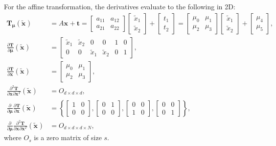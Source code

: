 \documentclass[]{article}
\newcommand{\vT}{\bm{T}}
\newcommand{\vmu}{\bm{\mu}}
\newcommand{\vTmu}{\bm{T_{\mu}}}
\newcommand{\vx}[1][]{\bm{x}_{#1}}
\newcommand{\vxt}[1][]{\bm{\widetilde x}_{#1}}
\newcommand{\D}[2]{\frac{\partial #1}{\partial #2}}
\newcommand{\Dd}[3]{\frac{\partial^2 #1}{\partial #2 \partial #3}}
\begin{document}
For the affine transformation, the derivatives evaluate to the
following in 2D:
\begin{align}
\vTmu(\vxt) &= A \vx + \bm{t} = \begin{bmatrix} a_{11} & a_{12}
\\ a_{21} & a_{22} \end{bmatrix} \begin{bmatrix} \widetilde x_1 \\
\widetilde x_2 \end{bmatrix} + \begin{bmatrix} t_1 \\ t_2
\end{bmatrix} = \begin{bmatrix} \mu_0 & \mu_1
\\ \mu_2 & \mu_3 \end{bmatrix} \begin{bmatrix} \widetilde x_1 \\
\widetilde x_2 \end{bmatrix} + \begin{bmatrix} \mu_4 \\ \mu_5
\end{bmatrix}, \\
\D{\vT}{\vmu}(\vxt) &= \begin{bmatrix} \widetilde x_1 & \widetilde
x_2 & 0 & 0 & 1 & 0 \\ 0 & 0 & \widetilde x_1 & \widetilde x_2 & 0 &
1 \end{bmatrix}, \\
\D{\vT}{\vx}(\vxt) &= \begin{bmatrix} \mu_0 & \mu_1 \\ \mu_2 & \mu_3 \end{bmatrix}, \\
\Dd{\vT}{\vx}{\vx^T}(\vxt) &= O_{d \times d \times d}, \\
\D{}{\vmu} \D{\vT}{\vx}(\vxt) &= \left\{ \begin{bmatrix} 1 & 0 \\
0 & 0 \end{bmatrix}, \begin{bmatrix} 0 & 1 \\ 0 & 0
\end{bmatrix}, \begin{bmatrix} 0 & 0 \\ 1 & 0
\end{bmatrix}, \begin{bmatrix} 0 & 0 \\ 0 & 1
\end{bmatrix} \right\}, \\
\D{}{\vmu} \Dd{\vT}{\vx}{\vx^T}(\vxt) &= O_{d \times d \times d
\times N},
\end{align}
where $O_s$ is a zero matrix of size $s$.
\end{document}
